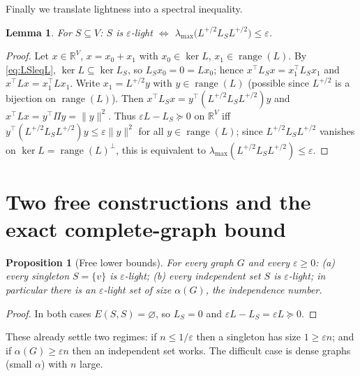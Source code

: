 \documentclass[12pt]{article}
\newtheorem{lemma}{Lemma}
\newtheorem{proposition}{Proposition}
\theoremstyle{definition}
\newcommand{\bR}{\mathbb{R}}
\newcommand{\eps}{\varepsilon}
\newcommand{\psd}{\succeq 0}
\begin{document}
Finally we translate lightness into a spectral inequality.

\begin{lemma}\label{lem:equiv}
For $S\subseteq V$: $S$ is $\eps$-light $\iff$ $\lambda_{\max}\!\big(L^{+/2}L_SL^{+/2}\big)\le\eps$.
\end{lemma}
\begin{proof}
Let $x\in\bR^V$, $x=x_0+x_1$ with $x_0\in\ker L$, $x_1\in\operatorname{range}(L)$. By
\eqref{eq:LSleqL}, $\ker L\subseteq\ker L_S$, so $L_S x_0=0=Lx_0$; hence $x^\top L_S x=x_1^\top L_S x_1$
and $x^\top L x=x_1^\top L x_1$. Write $x_1=L^{+/2}y$ with $y\in\operatorname{range}(L)$ (possible since
$L^{+/2}$ is a bijection on $\operatorname{range}(L)$). Then $x^\top L_S x=y^\top(L^{+/2}L_SL^{+/2})y$
and $x^\top Lx=y^\top\Pi y=\|y\|^2$. Thus $\eps L-L_S\psd$ on $\bR^V$ iff
$y^\top(L^{+/2}L_SL^{+/2})y\le\eps\|y\|^2$ for all $y\in\operatorname{range}(L)$; since
$L^{+/2}L_SL^{+/2}$ vanishes on $\ker L=\operatorname{range}(L)^\perp$, this is equivalent to
$\lambda_{\max}(L^{+/2}L_SL^{+/2})\le\eps$.
\end{proof}

\section{Two free constructions and the exact complete-graph bound}\label{sec:tight}

\begin{proposition}[Free lower bounds]\label{prop:free}
For every graph $G$ and every $\eps\ge0$:
(a) every singleton $S=\{v\}$ is $\eps$-light; (b) every independent set $S$ is $\eps$-light; in
particular there is an $\eps$-light set of size $\alpha(G)$, the independence number.
\end{proposition}
\begin{proof}
In both cases $E(S,S)=\varnothing$, so $L_S=0$ and $\eps L-L_S=\eps L\psd$.
\end{proof}

These already settle two regimes: if $n\le 1/\eps$ then a singleton has size $1\ge\eps n$; and if
$\alpha(G)\ge\eps n$ then an independent set works. The difficult case is dense graphs (small
$\alpha$) with $n$ large.
\end{document}
